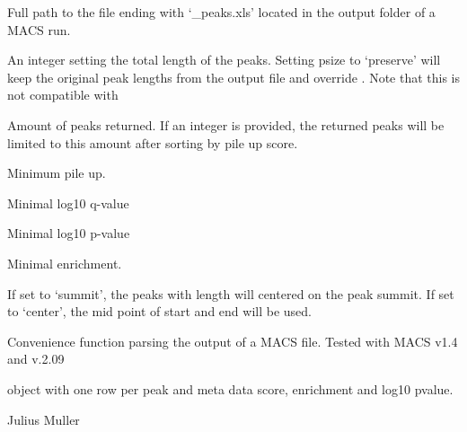 \documentclass[letterpaper]{book}
\begin{document}
%
\begin{Arguments}
\begin{ldescription}
\item[\code{macs\_peaks\_xls}] 
Full path to the file ending with `\_peaks.xls' located in the output folder of a MACS run.

\item[\code{psize}] 
An integer setting the total length of the peaks. Setting psize to `preserve' will keep the original peak lengths from the output file and override . Note that this is not compatible with 

\item[\code{amount}] 
Amount of peaks returned. If an integer is provided, the returned peaks will be limited to this amount after sorting by pile up score.

\item[\code{min\_pileup}] 
Minimum pile up.

\item[\code{log10qval}] 
Minimal log10 q-value

\item[\code{log10pval}] 
Minimal log10 p-value

\item[\code{fenrichment}] 
Minimal enrichment.

\item[\code{peak\_mid}] 
If set to `summit', the peaks with length  will centered on the peak summit. If set to `center', the mid point of start and end will be used.

\end{ldescription}
\end{Arguments}
%
\begin{Details}
Convenience function parsing the output of a MACS file. Tested with MACS v1.4 and v.2.09
\end{Details}
%
\begin{Value}
 object with one row per peak and meta data score, enrichment and log10 pvalue.
\end{Value}
%
\begin{Author}
Julius Muller 
\end{Author}
%
\begin{Examples}
\end{Examples}
\end{document}
